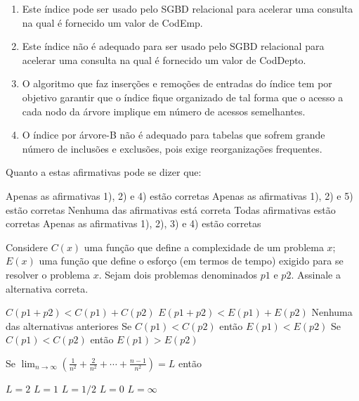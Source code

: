 \documentclass[12pt, addpoints]{exam}
\begin{document}
\begin{questions}
\begin{enumerate}
    \item Este índice pode ser usado pelo SGBD relacional para acelerar uma consulta na qual é fornecido um valor de CodEmp.

    \item Este índice não é adequado para ser usado pelo SGBD relacional para acelerar uma consulta na qual é fornecido um valor de CodDepto.

    \item O algoritmo que faz inserções e remoções de entradas do índice tem por objetivo garantir que o índice fique organizado de tal forma que o acesso a cada nodo da árvore implique em número de acessos semelhantes.

    \item O índice por árvore-B não é adequado para tabelas que sofrem grande número de inclusões e exclusões, pois exige reorganizações frequentes.

\end{enumerate}





Quanto a estas afirmativas pode se dizer que:
\begin{choices}
\choice Apenas as afirmativas 1), 2) e 4) estão corretas
\choice Apenas as afirmativas 1), 2) e 5) estão corretas
\choice Nenhuma das afirmativas está correta
\choice Todas afirmativas estão corretas
\choice Apenas as afirmativas 1), 2), 3) e 4) estão corretas
\end{choices}

\question

Considere \( C(x) \) uma função que define a complexidade de um problema \( x \); \( E(x) \) uma função que define o esforço (em termos de tempo) exigido para se resolver o problema \( x \). Sejam dois problemas denominados \( p1 \) e \( p2 \). Assinale a alternativa correta.


\begin{choices}
\choice \( C(p1 + p2) < C(p1) + C(p2) \)
\choice \( E(p1 + p2) < E(p1) + E(p2) \)
\choice Nenhuma das alternativas anteriores
\choice Se \( C(p1) < C(p2) \) então \( E(p1) < E(p2) \)
\choice Se \( C(p1) < C(p2) \) então \( E(p1) > E(p2) \)
\end{choices}

\question

Se \( \lim_{n \to \infty} \left( \frac{1}{n^2} + \frac{2}{n^2} + \cdots + \frac{n-1}{n^2} \right) = L \) então


\begin{choices}
\choice \( L = 2 \)
\choice \( L = 1 \)
\choice \( L = 1/2 \)
\choice \( L = 0 \)
\choice \( L = \infty \)
\end{choices}


\end{questions}
\end{document}
